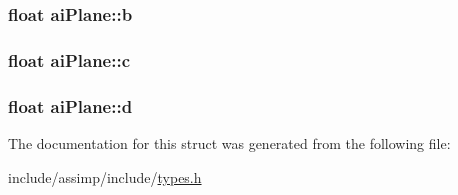 \hypertarget{structai_plane_a84ab33cd9b2f5325282b489f8a2bf11c}{
\subsubsection[{b}]{\setlength{\rightskip}{0pt plus 5cm}float ai\-Plane\-::b}}\label{structai_plane_a84ab33cd9b2f5325282b489f8a2bf11c}
\hypertarget{structai_plane_a7b0ea36c355ca003a5789088fb24da1f}{
\subsubsection[{c}]{\setlength{\rightskip}{0pt plus 5cm}float ai\-Plane\-::c}}\label{structai_plane_a7b0ea36c355ca003a5789088fb24da1f}
\hypertarget{structai_plane_ab8696b583b6fab46ae30cd5b691e7c9a}{
\subsubsection[{d}]{\setlength{\rightskip}{0pt plus 5cm}float ai\-Plane\-::d}}\label{structai_plane_ab8696b583b6fab46ae30cd5b691e7c9a}


The documentation for this struct was generated from the following file\-:\begin{DoxyCompactItemize}
\item 
include/assimp/include/\hyperlink{types_8h}{types.\-h}\end{DoxyCompactItemize}
